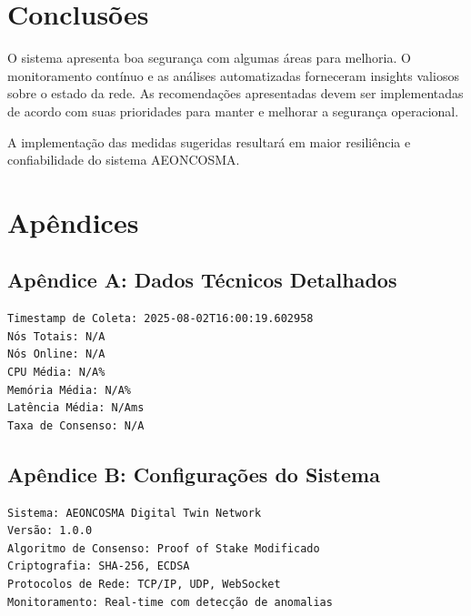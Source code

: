 \documentclass[12pt,a4paper]{article}
\begin{document}
\section{Conclusões}


O sistema apresenta boa segurança com algumas áreas para melhoria. O monitoramento contínuo e as análises automatizadas forneceram insights valiosos 
sobre o estado da rede. As recomendações apresentadas devem ser implementadas de acordo com 
suas prioridades para manter e melhorar a segurança operacional.

A implementação das medidas sugeridas resultará em maior resiliência e confiabilidade do 
sistema AEONCOSMA.


\section{Apêndices}

\subsection{Apêndice A: Dados Técnicos Detalhados}


\begin{verbatim}
Timestamp de Coleta: 2025-08-02T16:00:19.602958
Nós Totais: N/A
Nós Online: N/A
CPU Média: N/A%
Memória Média: N/A%
Latência Média: N/Ams
Taxa de Consenso: N/A
\end{verbatim}


\subsection{Apêndice B: Configurações do Sistema}


\begin{verbatim}
Sistema: AEONCOSMA Digital Twin Network
Versão: 1.0.0
Algoritmo de Consenso: Proof of Stake Modificado
Criptografia: SHA-256, ECDSA
Protocolos de Rede: TCP/IP, UDP, WebSocket
Monitoramento: Real-time com detecção de anomalias
\end{verbatim}
\end{document}
